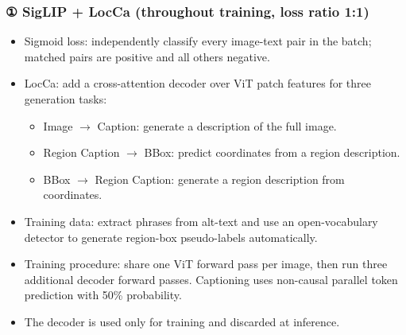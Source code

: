 \subsubsection{{①} SigLIP + LocCa (throughout training, loss ratio 1:1)}
\begin{itemize}
\item Sigmoid loss: independently classify every image-\allowbreak{}text pair in the batch; matched pairs are positive and all others negative.\allowbreak{}
\item LocCa: add a cross-\allowbreak{}attention decoder over ViT patch features for three generation tasks:
\begin{itemize}
\item Image \(\rightarrow\) Caption: generate a description of the full image.\allowbreak{}
\item Region Caption \(\rightarrow\) BBox: predict coordinates from a region description.\allowbreak{}
\item BBox \(\rightarrow\) Region Caption: generate a region description from coordinates.\allowbreak{}
\end{itemize}
\item Training data: extract phrases from alt-\allowbreak{}text and use an open-\allowbreak{}vocabulary detector to generate region-\allowbreak{}box pseudo-\allowbreak{}labels automatically.\allowbreak{}
\item Training procedure: share one ViT forward pass per image, then run three additional decoder forward passes.\allowbreak{} Captioning uses non-\allowbreak{}causal parallel token prediction with 50\% probability.\allowbreak{}
\item The decoder is used only for training and discarded at inference.\allowbreak{}
\end{itemize}
